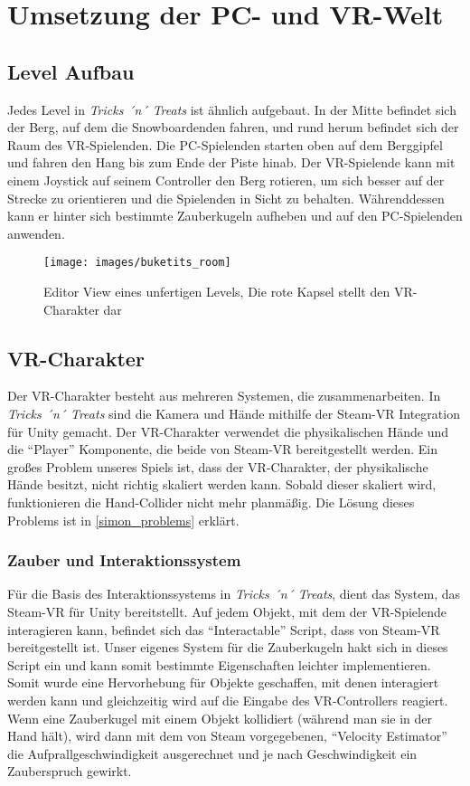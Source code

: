 \chapter{Umsetzung der PC- und VR-Welt}
\section{Level Aufbau}
Jedes Level in \emph{Tricks ´n´ Treats} ist ähnlich aufgebaut. 
In der Mitte befindet sich der Berg, auf dem die Snowboardenden fahren, und rund herum befindet sich der Raum des VR-Spielenden. Die PC-Spielenden starten oben auf dem Berggipfel und fahren den Hang bis zum Ende der Piste hinab. Der VR-Spielende kann mit einem Joystick auf seinem Controller den Berg rotieren, um sich besser auf der Strecke zu orientieren und die Spielenden in Sicht zu behalten. Währenddessen kann er hinter sich bestimmte Zauberkugeln aufheben und auf den PC-Spielenden anwenden.


\begin{figure}[H]
	\centering
	\texttt{[image: images/buketits\_room]}
	\caption{Editor View eines unfertigen Levels, Die rote Kapsel stellt den VR-Charakter dar}
\end{figure}

\section{VR-Charakter} \label{simon_vrspieler}
Der VR-Charakter besteht aus mehreren Systemen, die zusammenarbeiten. In \emph{Tricks ´n´ Treats} sind die Kamera und Hände mithilfe der Steam-VR Integration für Unity gemacht. Der VR-Charakter verwendet die physikalischen Hände und die "`Player"' Komponente, die beide von Steam-VR bereitgestellt werden. Ein großes Problem unseres Spiels ist, dass der VR-Charakter, der physikalische Hände besitzt, nicht richtig skaliert werden kann. Sobald dieser skaliert wird, funktionieren die Hand-Collider nicht mehr planmäßig. Die Lösung dieses Problems ist in \ref{simon_problems} erklärt.

\subsection{Zauber und Interaktionssystem}
Für die Basis des Interaktionssystems in \emph{Tricks ´n´ Treats}, dient das System, das Steam-VR für Unity bereitstellt. Auf jedem Objekt, mit dem der VR-Spielende interagieren kann, befindet sich das "`Interactable"' Script, dass von Steam-VR bereitgestellt ist. Unser eigenes System für die Zauberkugeln hakt sich in dieses Script ein und kann somit bestimmte Eigenschaften leichter implementieren. Somit wurde eine Hervorhebung für Objekte geschaffen, mit denen interagiert werden kann und gleichzeitig wird auf die Eingabe des VR-Controllers reagiert. Wenn eine Zauberkugel mit einem Objekt kollidiert (während man sie in der Hand hält), wird dann mit dem von Steam vorgegebenen, "`Velocity Estimator"' die Aufprallgeschwindigkeit ausgerechnet und je nach Geschwindigkeit ein Zauberspruch gewirkt.


